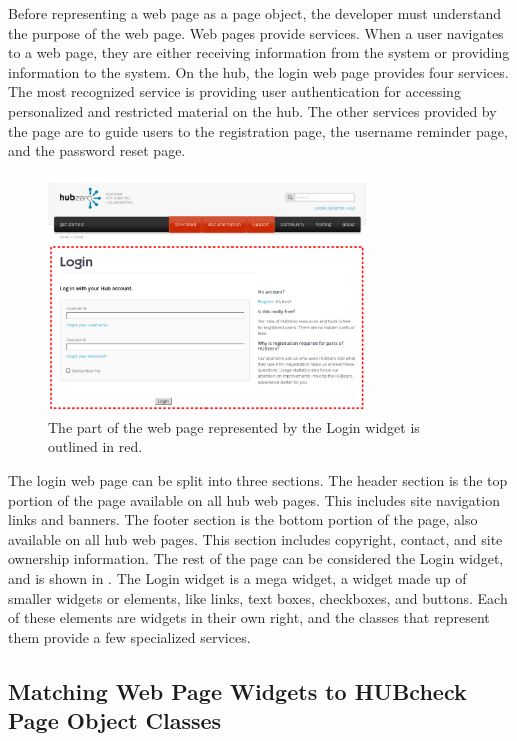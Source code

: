 Before representing a web page as a page object, the developer must understand
the purpose of the web page.  Web pages provide services. When a user navigates
to a web page, they are either receiving information from the system
or providing information to the system.  On the hub, the login web page provides
four services. The most recognized service is providing user authentication for
accessing personalized and restricted material on the hub. The other services
provided by the page are to guide users to the registration page, the username
reminder page, and the password reset page.

\begin{figure}[tbh]
  \centering
  \includegraphics[width=0.75\textwidth]
    {../../images/annotated/hubzero_login_page_parts.png}
  \caption{ The part of the web page represented by the Login widget is outlined in red. }
  \label{fig:hubzero_login_page_parts}
\end{figure}

The login web page can be split into three sections. The header section is the
top portion of the page available on all hub web pages. This includes site
navigation links and banners. The footer section is the bottom portion of the
page, also available on all hub web pages. This section includes copyright,
contact, and site ownership information. The rest of the page can be considered
the Login widget, and is shown in .
The Login widget is a mega widget, a widget made up of smaller widgets or
elements, like links, text boxes, checkboxes, and buttons. Each of these elements
are widgets in their own right, and the classes that represent them provide a
few specialized services.

\subsection{Matching Web Page Widgets to HUBcheck Page Object Classes}
\label{ssec:matching_widgets_to_page_objects}

